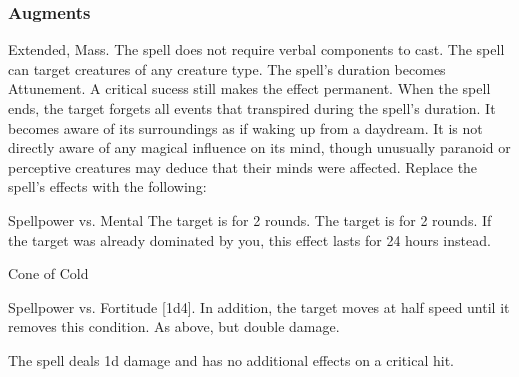 \subsubsection{Augments}
 Extended, Mass.
The spell does not require verbal components to cast.
The spell can target creatures of any creature type.
The spell's duration becomes Attunement.
A critical sucess still makes the effect permanent.
When the spell ends, the target forgets all events that transpired during the spell's duration.
It becomes aware of its surroundings as if waking up from a daydream.
It is not directly aware of any magical influence on its mind, though unusually paranoid or perceptive creatures may deduce that their minds were affected.
Replace
the spell's effects with the following:
\begin{augmenteffects}
\begin{spellattack}{Spellpower vs. Mental}
\spellsuccess The target is \confused for 2 rounds.
\spellcritical
The target is \dominated for 2 rounds.
If the target was already dominated by you, this effect lasts for 24 hours instead.
\end{spellattack}
\end{augmenteffects}
\begin{spellsection}{Cone of Cold}
\begin{spellheader}
\end{spellheader}
\begin{spellcontent}
\begin{spelltargetinginfo}
\end{spelltargetinginfo}
\begin{spelleffects}
\begin{spellattack}{Spellpower vs. Fortitude}
\spellsuccess
{}[1d4].
In addition, the target moves at half speed until it removes this condition.
\spellcritical As above, but double damage.
\end{spellattack}
\end{spelleffects}
\end{spellcontent}
\begin{spellfooter}
\miscastexplode
\end{spellfooter}
\begin{spellcantrip}
The spell deals \minus1d damage and has no additional effects on a critical hit.
\end{spellcantrip}
\end{spellsection}
